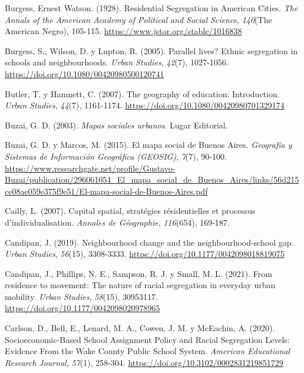 \documentclass[
  spanish,
  a4paper,%
  chapterprefix=true,%
  DIV=calc,%
  twoside]{scrbook}%
\newlength{\cslhangindent}
\newenvironment{CSLReferences}[2] %
 {\begin{list}{}{%
  \setlength{\itemindent}{0pt}
  \setlength{\leftmargin}{0pt}
  \setlength{\parsep}{0pt}
  \ifodd #1
   \setlength{\leftmargin}{\cslhangindent}
   \setlength{\itemindent}{-1\cslhangindent}
  \fi
  \setlength{\itemsep}{#2\baselineskip}}}
 {\end{list}}
\begin{document}
\begin{CSLReferences}{1}{0}
Burgess, Ernest Watson. (1928). Residential Segregation in American Cities. \emph{The Annals of the American Academy of Political and Social Science}, \emph{140}(The American Negro), 105-115. \url{https://www.jstor.org/stable/1016838}

Burgess, S., Wilson, D. y Lupton, R. (2005). Parallel lives? Ethnic segregation in schools and neighbourhoods. \emph{Urban Studies}, \emph{42}(7), 1027-1056. \url{https://doi.org/10.1080/00420980500120741}

Butler, T. y Hamnett, C. (2007). The geography of education: Introduction. \emph{Urban Studies}, \emph{44}(7), 1161-1174. \url{https://doi.org/10.1080/00420980701329174}

Buzai, G. D. (2003). \emph{Mapas sociales urbanos}. Lugar Editorial.

Buzai, G. D. y Marcos, M. (2015). El mapa social de Buenos Aires. \emph{Geografía y Sistemas de Información Geográfica (GEOSIG)}, \emph{7}(7), 90-100. \url{https://www.researchgate.net/profile/Gustavo-Buzai/publication/296061054_El_mapa_social_de_Buenos_Aires/links/56d215ce08ae059e375f9e51/El-mapa-social-de-Buenos-Aires.pdf}

Cailly, L. (2007). Capital spatial, stratégies résidentielles et processus d'individualisation. \emph{Annales de Géographie}, \emph{116}(654), 169-187.

Candipan, J. (2019). Neighbourhood change and the neighbourhood-school gap. \emph{Urban Studies}, \emph{56}(15), 3308-3333. \url{https://doi.org/10.1177/0042098018819075}

Candipan, J., Phillips, N. E., Sampson, R. J. y Small, M. L. (2021). From residence to movement: The nature of racial segregation in everyday urban mobility. \emph{Urban Studies}, \emph{58}(15), 30953117. \url{https://doi.org/10.1177/0042098020978965}

Carlson, D., Bell, E., Lenard, M. A., Cowen, J. M. y McEachin, A. (2020). Socioeconomic-Based School Assignment Policy and Racial Segregation Levels: Evidence From the Wake County Public School System. \emph{American Educational Research Journal}, \emph{57}(1), 258-304. \url{https://doi.org/10.3102/0002831219851729}


\end{CSLReferences}
\end{document}
